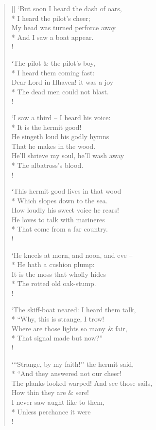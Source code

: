 \documentclass[MAIN]{subfiles}
\begin{document}
\begin{verse}[\versewidth]
`But soon I heard the dash of oars,\\*
\vin I heard the pilot's cheer;\\
My head was turned perforce away\\*
\vin And I saw a boat appear.\\!

`The pilot \& the pilot's boy,\\*
\vin I heard them coming fast:\\
Dear Lord in Hhaven! it was a joy\\*
\vin The dead men could not blast.\\!

`I saw a third -- I heard his voice:\\*
\vin It is the hermit good!\\
He singeth loud his godly hymns\\
\vin That he makes in the wood.\\
He'll shrieve my soul, he'll wash away\\*
\vin The albatross's blood.\\!

`This hermit good lives in that wood\\*
\vin Which slopes down to the sea.\\
How loudly his sweet voice he rears!\\
He loves to talk with marineres\\*
\vin That come from a far country.\\!

`He kneels at morn, and noon, and eve --\\*
\vin He hath a cushion plump:\\
It is the moss that wholly hides\\*
\vin The rotted old oak-stump.\\!

`The skiff-boat neared: I heard them talk,\\*
\vin ``Why, this is strange, I trow!\\
Where are those lights so many \& fair,\\*
\vin That signal made but now?''\\!

`{``}Strange, by my faith!'' the hermit said,\\*
\vin ``And they answered not our cheer!\\
The planks looked warped! And see those sails,\\
\vin How thin they are \& sere!\\
I never saw aught like to them,\\*
\vin Unless perchance it were\\!


\end{verse}
\end{document}
